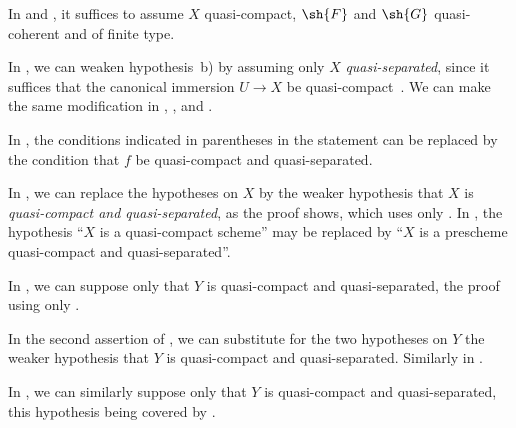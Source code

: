 \begin{env}[1.7.6]
\label{IV.1.7.6}
In  and , it suffices to assume $X$ quasi-compact, $\sh{F}$ and $\sh{G}$ quasi-coherent and of finite type.
\end{env}

\begin{env}[1.7.7]
\label{IV.1.7.7}
In , we can weaken hypothesis~b) by assuming only $X$ \emph{quasi-separated}, since it suffices that the canonical immersion $U\to X$ be quasi-compact~.
We can make the same modification in , , and .
\end{env}

\begin{env}[1.7.8]
\label{IV.1.7.8}
In , the conditions indicated in parentheses in the statement can be replaced by the condition that $f$ be quasi-compact and quasi-separated.
\end{env}

\begin{env}[1.7.9]
\label{IV.1.7.9}
In , we can replace the hypotheses on $X$ by the weaker hypothesis that $X$ is \emph{quasi-compact and quasi-separated}, as the proof shows, which uses only .
In , the hypothesis ``$X$ is a quasi-compact scheme'' may be replaced by ``$X$ is a prescheme quasi-compact and quasi-separated''.
\end{env}

\begin{env}[1.7.10]
\label{IV.1.7.10}
In , we can suppose only that $Y$ is quasi-compact and quasi-separated, the proof using only .
\end{env}

\begin{env}[1.7.11]
\label{IV.1.7.11}
In the second assertion of , we can substitute for the two hypotheses on $Y$ the weaker hypothesis that $Y$ is quasi-compact and quasi-separated.
Similarly in .
\end{env}

\begin{env}[1.7.12]
\label{IV.1.7.12}
In , we can similarly suppose only that $Y$ is quasi-compact and quasi-separated, this hypothesis being covered by .
\end{env}

